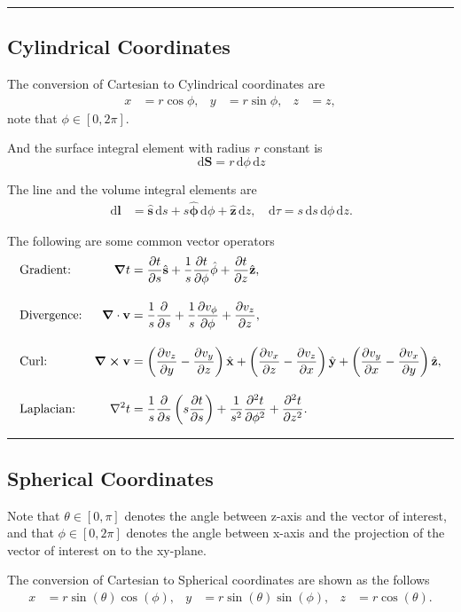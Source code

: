 \documentclass[a4paper]{article}
\newcommand{\dmr}[1]{\, \mathrm{d}#1} %
\numberwithin{equation}{subsection}
\let\oldhat\hat
\renewcommand{\vec}[1]{\mathbf{#1}}
\renewcommand{\hat}[1]{\oldhat{\mathbf{#1}}}
\begin{document}
\par\noindent\rule{\textwidth}{0.4pt}
\subsection{Cylindrical Coordinates}
The conversion of Cartesian to Cylindrical coordinates\cite{noauthor_cylindrical_2021} are 
\begin{align*}
    x &= r \cos \phi, & y &= r \sin\phi, & z &= z,
\end{align*}
note that $\phi \in [0,2\pi].$

And the surface integral element with radius $r$ constant is
\[
    \dmr{\vec{S}}    = r \dmr{\phi}\dmr{z}
\]    

The line and the volume integral elements are
\begin{align*}
    \dmr{\vec{l}} &= \hat{s}\dmr{s} + s\hat{\phi}\dmr{\phi}+\hat{z}\dmr{z}, & \dmr{\tau} = s\dmr{s}\dmr{\phi}\dmr{z}.
\end{align*}

The following are some common vector operators
\begin{align*}
    &\text{Gradient:} &\grad t  &= \pdv{t}{s}\hat{s}+\frac{1}{s}\pdv{t}{\phi}\hat{\phi}+\pdv{t}{z}\hat{z},\\[1em]
    &\text{Divergence:} &\grad\cdot\vec{v} &= \frac{1}{s}\pdv{}{s}(sv_s)+\frac{1}{s}\pdv{v_\phi}{\phi}+\pdv{v_z}{z},\\[1em]
    &\text{Curl:} &\grad \cross \vec{v} &= \left(\pdv{v_z}{y}-\pdv{v_y}{z}\right)\hat{x} + \left(\pdv{v_x}{z}-\pdv{v_z}{x}\right)\hat{y} + \left(\pdv{v_y}{x}-\pdv{v_x}{y}\right)\hat{z},\\[1em]
    &\text{Laplacian:} &\laplacian t &= \frac{1}{s}\pdv{}{s}\left(s\pdv{t}{s}\right)+\frac{1}{s^2}\pdv[2]{t}{\phi}+\pdv[2]{t}{z}. 
\end{align*}
\par\noindent\rule{\textwidth}{0.4pt}

\subsection{Spherical Coordinates}
Note that $\theta\in[0,\pi]$ denotes the angle between z-axis and the vector of interest, and that $\phi\in[0, 2\pi]$ denotes the angle between x-axis and the projection of the vector of interest on to the xy-plane.\cite{noauthor_cylindrical_2021}

The conversion of Cartesian to Spherical coordinates are shown as the follows
\begin{align*}
    x &= r \sin(\theta)\cos(\phi), & y &= r \sin(\theta)\sin(\phi), & z &= r \cos(\theta).\\
\end{align*}
\end{document}
